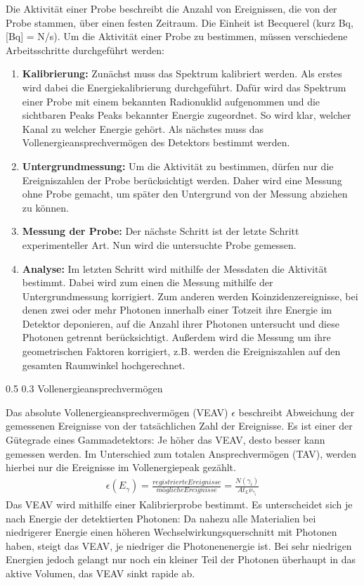 \documentclass[german, %
parskip=full, %
bibliography=totoc, %
]{scrartcl}
\makeatletter
\renewcommand\subsection{\@startsection 
   {subsection}{2}{0mm}%
   {0.5\baselineskip}%
   {0.3\baselineskip}%
   {\bfseries\sffamily\large}%
   }
\makeatother
\begin{document}
Die Aktivität einer Probe beschreibt die Anzahl von Ereignissen, die von der Probe stammen, über einen festen Zeitraum. Die Einheit ist Becquerel (kurz Bq, [Bq] = N/s). Um die Aktivität einer Probe zu bestimmen, müssen verschiedene Arbeitsschritte durchgeführt werden:
\begin{enumerate}
\item \textbf{Kalibrierung: }Zunächst muss das Spektrum kalibriert werden. Als erstes wird dabei die Energiekalibrierung durchgeführt. Dafür wird das Spektrum einer Probe mit einem bekannten Radionuklid aufgenommen und die sichtbaren Peaks Peaks bekannter Energie zugeordnet. So wird klar, welcher Kanal zu welcher Energie gehört. Als nächstes muss das Vollenergieansprechvermögen des Detektors bestimmt werden.
\item \textbf{Untergrundmessung: }Um die Aktivität zu bestimmen, dürfen nur die Ereigniszahlen der Probe berücksichtigt werden. Daher wird eine Messung ohne Probe gemacht, um später den Untergrund von der Messung abziehen zu können.
\item \textbf{Messung der Probe: }Der nächste Schritt ist der letzte Schritt experimenteller Art. Nun wird die untersuchte Probe gemessen.
\item \textbf{Analyse: }Im letzten Schritt wird mithilfe der Messdaten die Aktivität bestimmt. Dabei wird zum einen die Messung mithilfe der Untergrundmessung korrigiert. Zum anderen werden Koinzidenzereignisse, bei denen zwei oder mehr Photonen innerhalb einer Totzeit ihre Energie im Detektor deponieren, auf die Anzahl ihrer Photonen untersucht und diese Photonen getrennt berücksichtigt. Außerdem wird die Messung um ihre geometrischen Faktoren korrigiert, z.B. werden die Ereigniszahlen auf den gesamten Raumwinkel hochgerechnet.
\end{enumerate}

\subsection{Vollenergieansprechvermögen}

Das absolute Vollenergieansprechvermögen (VEAV) $\epsilon$ beschreibt Abweichung der gemessenen Ereignisse von der tatsächlichen Zahl der Ereignisse. Es ist einer der Gütegrade eines Gammadetektors: Je höher das VEAV, desto besser kann gemessen werden. Im Unterschied zum totalen Ansprechvermögen (TAV), werden hierbei nur die Ereignisse im Vollenergiepeak gezählt. 
\begin{align}
\epsilon (E_{\gamma}) = \frac{registrierte Ereignisse}{mögliche Ereignisse} = \frac{N (\gamma_i)}{A t_L \nu_{\gamma_i}} \label{for:veav}
\end{align}
Das VEAV wird mithilfe einer Kalibrierprobe bestimmt. Es unterscheidet sich je nach Energie der detektierten Photonen: Da nahezu alle Materialien bei niedrigerer Energie einen höheren Wechselwirkungsquerschnitt mit Photonen haben, steigt das VEAV, je niedriger die Photonenenergie ist. Bei sehr niedrigen Energien jedoch gelangt nur noch ein kleiner Teil der Photonen überhaupt in das aktive Volumen, das VEAV sinkt rapide ab.
\end{document}
